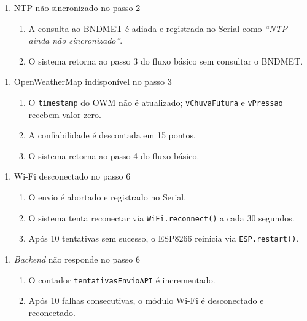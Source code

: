 \begin{enumerate}
  \renewcommand{\theenumi}{2b}
  \renewcommand{\labelenumi}{\theenumi.}
  \item NTP não sincronizado no passo 2
  \begin{enumerate}
  \item A consulta ao BNDMET é adiada e registrada no Serial
        como \textit{``NTP ainda não sincronizado''}.
  \item O sistema retorna ao passo 3 do fluxo básico sem
        consultar o BNDMET.
  \end{enumerate}
\end{enumerate}

\begin{enumerate}
  \renewcommand{\theenumi}{3a}
  \renewcommand{\labelenumi}{\theenumi.}
  \item OpenWeatherMap indisponível no passo 3
  \begin{enumerate}
  \item O \texttt{timestamp} do OWM não é atualizado;
        \texttt{vChuvaFutura} e \texttt{vPressao} recebem
        valor zero.
  \item A confiabilidade é descontada em 15 pontos.
  \item O sistema retorna ao passo 4 do fluxo básico.
  \end{enumerate}
\end{enumerate}

\begin{enumerate}
  \renewcommand{\theenumi}{6a}
  \renewcommand{\labelenumi}{\theenumi.}
  \item Wi-Fi desconectado no passo 6
  \begin{enumerate}
  \item O envio é abortado e registrado no Serial.
  \item O sistema tenta reconectar via \texttt{WiFi.reconnect()}
        a cada 30 segundos.
  \item Após 10 tentativas sem sucesso, o ESP8266 reinicia
        via \texttt{ESP.restart()}.
  \end{enumerate}
\end{enumerate}

\begin{enumerate}
  \renewcommand{\theenumi}{6b}
  \renewcommand{\labelenumi}{\theenumi.}
  \item \textit{Backend} não responde no passo 6
  \begin{enumerate}
  \item O contador \texttt{tentativasEnvioAPI} é incrementado.
  \item Após 10 falhas consecutivas, o módulo Wi-Fi é
        desconectado e reconectado.
  \end{enumerate}
\end{enumerate}

